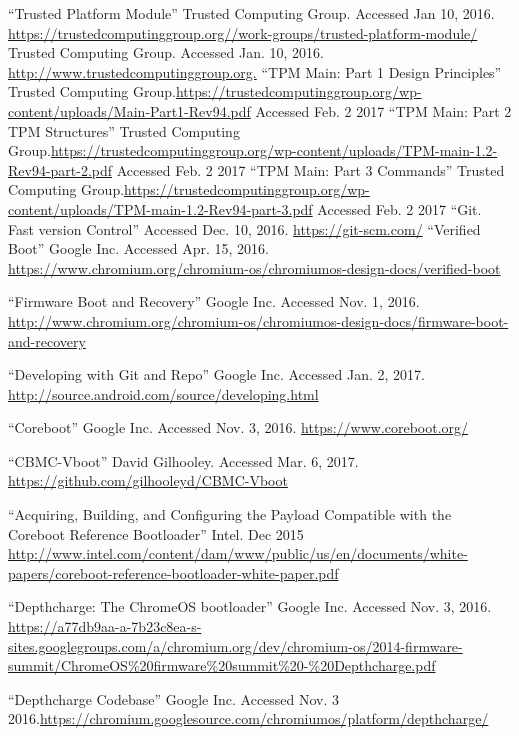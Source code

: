 \documentclass[12pt,lot, lof]{puthesis}
\begin{document}
\begin{flushleft}
\begin{footnotesize}
\begin{thebibliography}{\kern\bibindent}
        ``Trusted Platform Module'' Trusted Computing Group. Accessed Jan 10, 2016. \url{https://trustedcomputinggroup.org//work-groups/trusted-platform-module/}
        Trusted Computing Group. Accessed Jan. 10, 2016. \url{http://www.trustedcomputinggroup.org.}
        ``TPM Main: Part 1 Design Principles'' Trusted Computing Group.\url{https://trustedcomputinggroup.org/wp-content/uploads/Main-Part1-Rev94.pdf} Accessed Feb. 2 2017
        ``TPM Main: Part 2 TPM Structures'' Trusted Computing Group.\url{https://trustedcomputinggroup.org/wp-content/uploads/TPM-main-1.2-Rev94-part-2.pdf} Accessed Feb. 2 2017
        ``TPM Main: Part 3 Commands'' Trusted Computing Group.\url{https://trustedcomputinggroup.org/wp-content/uploads/TPM-main-1.2-Rev94-part-3.pdf} Accessed Feb. 2 2017
        ``Git. Fast version Control'' Accessed Dec. 10, 2016. \url{https://git-scm.com/}
        ``Verified Boot'' Google Inc. Accessed Apr. 15, 2016. \url{https://www.chromium.org/chromium-os/chromiumos-design-docs/verified-boot}

    ``Firmware Boot and Recovery'' Google Inc. Accessed Nov. 1, 2016. \url{http://www.chromium.org/chromium-os/chromiumos-design-docs/firmware-boot-and-recovery}

    ``Developing with Git and Repo'' Google Inc. Accessed Jan. 2, 2017. \url{http://source.android.com/source/developing.html}

    ``Coreboot'' Google Inc. Accessed Nov. 3, 2016. \url{https://www.coreboot.org/}

    ``CBMC-Vboot'' David Gilhooley. Accessed Mar. 6, 2017. \url{https://github.com/gilhooleyd/CBMC-Vboot}

    ``Acquiring, Building, and Configuring the Payload Compatible with the Coreboot Reference Bootloader'' Intel. Dec 2015 \url{http://www.intel.com/content/dam/www/public/us/en/documents/white-papers/coreboot-reference-bootloader-white-paper.pdf}

    ``Depthcharge: The ChromeOS bootloader'' Google Inc. Accessed Nov. 3, 2016.
    \url{https://a77db9aa-a-7b23c8ea-s-sites.googlegroups.com/a/chromium.org/dev/chromium-os/2014-firmware-summit/ChromeOS\%20firmware\%20summit\%20-\%20Depthcharge.pdf}

    ``Depthcharge Codebase'' Google Inc. Accessed Nov. 3 2016.\url{https://chromium.googlesource.com/chromiumos/platform/depthcharge/}


\end{thebibliography}
\end{footnotesize}
\end{flushleft}
\end{document}
